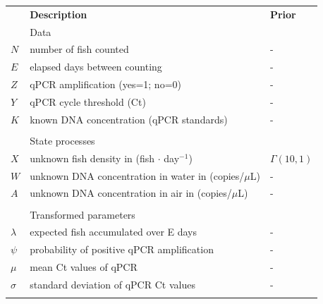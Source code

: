 \documentclass{article}
\begin{document}
\begin{table}[h]
    \centering
    \begin{tabular}{lll}
         & \textbf{Description} & \textbf{Prior} \\
&Data & \\
\hline
$N$ & number of fish counted & - \\
$E$ & elapsed days between counting & - \\
$Z$ & qPCR amplification (yes=1; no=0) & - \\
$Y$ & qPCR cycle threshold (Ct) & - \\
$K$ & known DNA concentration (qPCR standards) & - \\

&&\\
&State processes&\\
\hline
$X$ & unknown fish density in (fish $\cdot$ day$^{-1}$) & $\Gamma(10,1)$ \\
$W$ & unknown DNA concentration in water in (copies/$\mu$L) & - \\
$A$ & unknown DNA concentration in air in (copies/$\mu$L) & - \\
&&\\

&Transformed parameters&\\
\hline
$\lambda$& expected fish accumulated over E days & - \\
$\psi$& probability of positive qPCR amplification & - \\
$\mu$& mean Ct values of qPCR & - \\
$\sigma$& standard deviation of qPCR Ct values & - \\
&&\\


\end{tabular}
\end{table}
\end{document}
